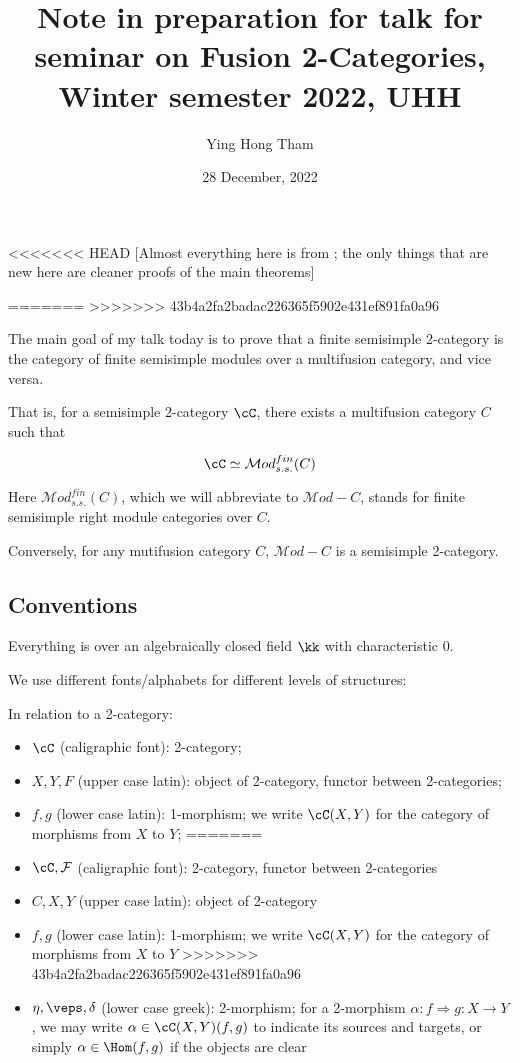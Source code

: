 \documentclass[12pt]{article}
\newcommand{\Mod}{{\mathcal{M}od}}
\newcommand{\Mod}{{\mathcal{M}od}}
\begin{document}
\title{Note in preparation for talk for seminar on Fusion 2-Categories, Winter semester 2022, UHH}
\author{Ying Hong Tham}
\date{28 December, 2022}
\maketitle

<<<<<<< HEAD
[Almost everything here is from \cite{DRfusion};
the only things that are new here are
cleaner proofs of the main theorems]

=======
>>>>>>> 43b4a2fa2badac226365f5902e431ef891fa0a96

The main goal of my talk today is to prove that
a finite semisimple 2-category is the
category of finite semisimple modules
over a multifusion category,
and vice versa.


That is, for a semisimple 2-category $\cC$,
there exists a multifusion category $C$
such that

\[
\cC \simeq \Mod_{s.s.}^{fin}(C)
\]

Here $\Mod_{s.s.}^{fin}(C)$,
which we will abbreviate to $\Mod-C$,
stands for finite semisimple right module categories over $C$.

Conversely, for any mutifusion category $C$,
$\Mod-C$ is a semisimple 2-category.



\subsection{Conventions}

Everything is over an algebraically closed field $\kk$
with characteristic 0.

We use different fonts/alphabets for different levels
of structures:

In relation to a 2-category:
\begin{itemize}
<<<<<<< HEAD
\item $\cC$ (caligraphic font): 2-category;

\item $X,Y,F$ (upper case latin): object of 2-category,
	functor between 2-categories;

\item $f,g$ (lower case latin): 1-morphism;
	we write $\cC(X,Y)$ for the category of morphisms
	from $X$ to $Y$;
=======
\item $\cC,\mathcal{F}$ (caligraphic font): 2-category,
	functor between 2-categories

\item $C,X,Y$ (upper case latin): object of 2-category

\item $f,g$ (lower case latin): 1-morphism;
	we write $\cC(X,Y)$ for the category of morphisms
	from $X$ to $Y$
>>>>>>> 43b4a2fa2badac226365f5902e431ef891fa0a96

\item $\eta,\veps,\delta$ (lower case greek): 2-morphism;
	for a 2-morphism $\alpha: f \Rightarrow g: X \to Y$,
	we may write $\alpha \in \cC(X,Y)(f,g)$
	to indicate its sources and targets,
	or simply $\alpha \in \Hom(f,g)$ if the objects are clear
\end{itemize}
\end{document}
